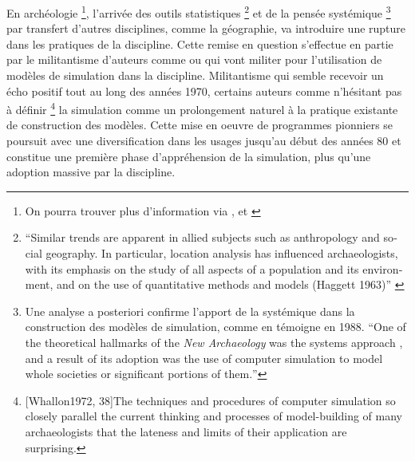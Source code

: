 En archéologie \footnote{On pourra trouver plus d'information via \autocite{Kohler2011}, et \autocite{Lake2013}}, l'arrivée des outils statistiques \footnote{\foreignquote{english}{Similar trends are apparent in allied subjects such as anthropology and social geography. In particular, location analysis has influenced archaeologists, with its emphasis on the study of all aspects of a population and its environment, and on the use of quantitative methods and models (Haggett 1963)} \autocite{Doran1970}} et de la pensée systémique \autocite{Flannery1968, Binford1968} \footnote{Une analyse a posteriori confirme l'apport de la systémique dans la construction des modèles de simulation, comme en témoigne \textcite{Aldenderfer1998} en 1988. \foreignquote{english}{One of the theoretical hallmarks of the \textit{New Archaeology} was the systems approach \autocite{Aldenderfer1991}, and a result of its adoption was the use of computer simulation to model whole societies or significant portions of them.}} par transfert d'autres disciplines, comme la géographie, va introduire une rupture dans les pratiques de la discipline. Cette remise en question s'effectue en partie par le militantisme d'auteurs comme \textcite{Clarke1968} ou \textcite{Doran1970} qui vont militer pour l'utilisation de modèles de simulation dans la discipline. Militantisme qui semble recevoir un écho positif tout au long des années 1970, certains auteurs comme \textcite[38]{Whallon1972} n'hésitant pas à définir \footnote{ [Whallon1972, 38]{The techniques and procedures of computer simulation so closely parallel the current thinking and processes of model-building of many archaeologists that the lateness and limits of their application are surprising.}} la simulation comme un prolongement naturel à la pratique existante de construction des modèles. Cette mise en oeuvre de programmes pionniers se poursuit avec une diversification dans les usages jusqu'au début des années 80 et constitue une première phase d'appréhension de la simulation, plus qu'une adoption massive par la discipline. \autocite{Lake2013}



